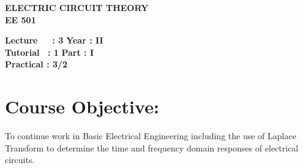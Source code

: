 \begin{center}
    \textbf{\huge{\uppercase{Electric Circuit Theory}}}
    \\
    \vspace{.5cm}
    \textbf{\large{EE 501}}
\end{center}

\noindent\textbf{Lecture\ \ \ : 3} \hfill \textbf{Year : II } \\
\textbf{Tutorial \ : 1} \hfill \textbf{Part : I } \\
\textbf{Practical : 3/2}  \\

\par
\noindent 
\section*{Course Objective:}
To continue work in Basic Electrical Engineering including the use of Laplace Transform to determine the time and frequency domain responses of electrical circuits.

